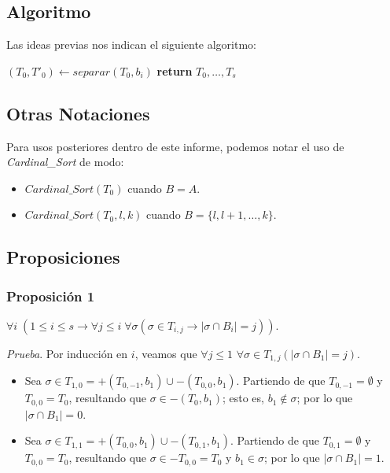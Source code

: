 \documentclass[12pt, letterpaper, twoside]{article}
\begin{document}
    \subsection{Algoritmo}
    Las ideas previas nos indican el siguiente algoritmo: 
    \begin{algorithm}
        \begin{algorithmic}[1]
                    \State $(T_0, T'_0) \leftarrow separar(T_0, b_i)$
                    \EndFor
                \EndFor
                \State \textbf{return} $T_0,\dots,T_s$
            \EndProcedure
        \end{algorithmic}
    \end{algorithm}

    \newpage
    \subsection{Otras Notaciones}
    Para usos posteriores dentro de este informe, podemos notar el uso de \emph{Cardinal\_Sort} de modo:
    \begin{itemize}
        \item $Cardinal\_Sort(T_0)$ cuando $B=A$.
        \item $Cardinal\_Sort(T_0, l, k)$ cuando $B=\{l, l+1,\dots,k\}$.
    \end{itemize}

    \subsection{Proposiciones}
    \subsubsection{Proposición 1}
    $\forall{i}\;(1\leq{i}\leq{s}\rightarrow\forall{j}\leq{i}\;\forall{\sigma}(\sigma\in{T_{i,j}}\rightarrow|\sigma\cap{B_i}|=j))$.

    \emph{Prueba}. Por inducción en $i$, veamos que $\forall{j}\leq{1}$ $\forall\sigma\in{T_{1,j}}(|\sigma\cap{B_1}|=j)$.
    \begin{itemize}
        \item Sea $\sigma\in{T_{1,0}} = +(T_{0,-1}, b_1) \cup -(T_{0,0}, b_1).$ Partiendo de que $T_{0,-1}=\emptyset$ y $T_{0,0}=T_0$, resultando que $\sigma\in{-(T_0,b_1)}$; esto es, $b_1\notin\sigma$; por lo que $|\sigma\cap{B_1}|=0$.
        \item Sea $\sigma\in{T_{1,1}} = +(T_{0,0}, b_1) \cup -(T_{0,1}, b_1).$ Partiendo de que $T_{0,1}=\emptyset$ y $T_{0,0}=T_0$, resultando que $\sigma\in{-T_{0,0}}=T_0$ y $b_1\in\sigma$; por lo que $|\sigma\cap{B_1}|=1$.
    \end{itemize}
\end{document}
